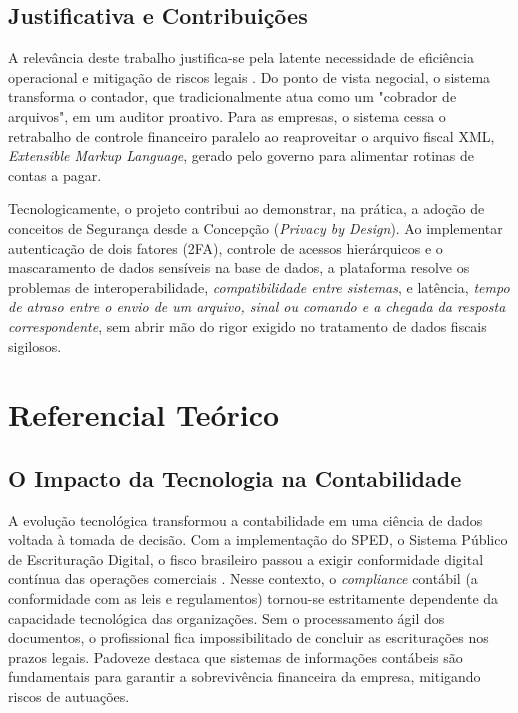 \documentclass[12pt]{article}
\begin{document}

\subsection{Justificativa e Contribuições}

A relevância deste trabalho justifica-se pela latente necessidade de eficiência operacional e mitigação de riscos legais \cite{laudon2014}. Do ponto de vista negocial, o sistema transforma o contador, que tradicionalmente atua como um "cobrador de arquivos", em um auditor proativo. Para as empresas, o sistema cessa o retrabalho de controle financeiro paralelo ao reaproveitar o arquivo fiscal XML, \textit{Extensible Markup Language}, gerado pelo governo para alimentar rotinas de contas a pagar.

Tecnologicamente, o projeto contribui ao demonstrar, na prática, a adoção de conceitos de Segurança desde a Concepção (\textit{Privacy by Design}). Ao implementar autenticação de dois fatores (2FA), controle de acessos hierárquicos e o mascaramento de dados sensíveis na base de dados, a plataforma resolve os problemas de interoperabilidade, \textit{compatibilidade entre sistemas}, e latência, \textit{tempo de atraso entre o envio de um arquivo, sinal ou comando e a chegada da resposta correspondente}, sem abrir mão do rigor exigido no tratamento de dados fiscais sigilosos.

\section{Referencial Teórico}

\subsection{O Impacto da Tecnologia na Contabilidade}
A evolução tecnológica transformou a contabilidade em uma ciência de dados voltada à tomada de decisão. Com a implementação do SPED, o Sistema Público de Escrituração Digital, o fisco brasileiro passou a exigir conformidade digital contínua das operações comerciais \cite{marion2020}. Nesse contexto, o \textit{compliance} contábil (a conformidade com as leis e regulamentos) tornou-se estritamente dependente da capacidade tecnológica das organizações. Sem o processamento ágil dos documentos, o profissional fica impossibilitado de concluir as escriturações nos prazos legais. Padoveze \cite{padoveze2015} destaca que sistemas de informações contábeis são fundamentais para garantir a sobrevivência financeira da empresa, mitigando riscos de autuações.
\end{document}
